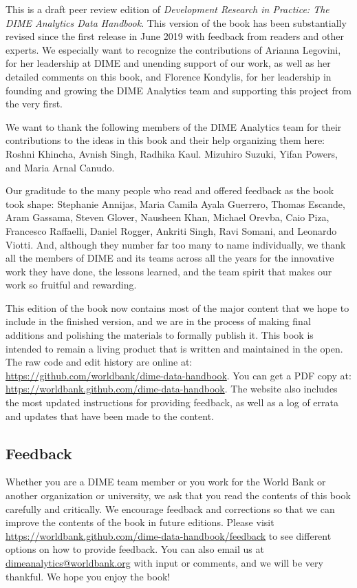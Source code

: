 This is a draft peer review edition of
\textit{Development Research in Practice:
The DIME Analytics Data Handbook}.
This version of the book has been substantially revised
since the first release in June 2019
with feedback from readers and other experts.
We especially want to recognize the contributions of
Arianna Legovini, for her leadership at DIME and unending support of our work, 
as well as her detailed comments on this book, and 
Florence Kondylis, for her leadership in founding and growing the DIME Analytics team
and supporting this project from the very first.
 
We want to thank the following members 
of the DIME Analytics team for their contributions 
to the ideas in this book and their help organizing them here: 
Roshni Khincha, Avnish Singh, Radhika Kaul.
Mizuhiro Suzuki, Yifan Powers, and Maria Arnal Canudo.

Our graditude to the many people who read and offered feedback as the book took shape:
Stephanie Annijas,
Maria Camila Ayala Guerrero,
Thomas Escande,
Aram Gassama,
Steven Glover,
Nausheen Khan,
Michael Orevba,
Caio Piza,
Francesco Raffaelli,
Daniel Rogger,
Ankriti Singh,
Ravi Somani,
and Leonardo Viotti.
And, although they number far too many to name individually, 
we thank all the members of DIME and its teams across all the years
for the innovative work they have done, the lessons learned,
and the team spirit that makes our work so fruitful and rewarding.

This edition of the book now contains most of the major content
that we hope to include in the finished version,
and we are in the process of making final additions
and polishing the materials to formally publish it.
This book is intended to remain a living product
that is written and maintained in the open.
The raw code and edit history are online at:
\url{https://github.com/worldbank/dime-data-handbook}.
You can get a PDF copy at:
\url{https://worldbank.github.com/dime-data-handbook}.
The website also includes the most updated instructions
for providing feedback, as well as
a log of errata and updates that have been made to the content.

\subsection{Feedback}

Whether you are a DIME team member or you work for the World Bank
or another organization or university,
we ask that you read the contents of this book carefully and critically.
We encourage feedback and corrections
so that we can improve the contents of the book
in future editions. Please visit
\url{https://worldbank.github.com/dime-data-handbook/feedback} to
see different options on how to provide feedback.
You can also email us at \url{dimeanalytics@worldbank.org}
with input or comments, and we will be very thankful.
We hope you enjoy the book!
